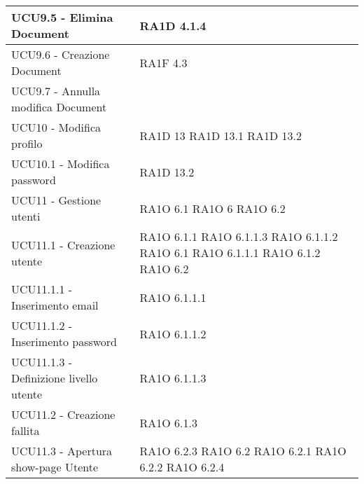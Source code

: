 \begin{center}
\begin{longtable}{ | p{5cm} | p{5cm} |}
            UCU9.5 - Elimina Document &  RA1D 4.1.4  \newline  \\ \hline      
            UCU9.6 - Creazione Document &  RA1F 4.3 \newline  \\ \hline      
            UCU9.7 - Annulla modifica Document &  \\ \hline      
            UCU10 - Modifica profilo &  RA1D 13 \newline  RA1D 13.1 \newline  RA1D 13.2 \newline  \\ \hline      
            UCU10.1 - Modifica password &  RA1D 13.2 \newline  \\ \hline      
            UCU11 - Gestione utenti &  RA1O 6.1  \newline  RA1O 6 \newline  RA1O 6.2  \newline  \\ \hline      
            UCU11.1 - Creazione utente &  RA1O 6.1.1  \newline  RA1O 6.1.1.3  \newline  RA1O 6.1.1.2 \newline  RA1O 6.1  \newline  RA1O 6.1.1.1  \newline  RA1O 6.1.2  \newline  RA1O 6.2  \newline  \\ \hline      
            UCU11.1.1 - Inserimento email &  RA1O 6.1.1.1  \newline  \\ \hline      
            UCU11.1.2 - Inserimento password &  RA1O 6.1.1.2 \newline  \\ \hline      
            UCU11.1.3 - Definizione livello utente &  RA1O 6.1.1.3  \newline  \\ \hline      
            UCU11.2 - Creazione fallita &  RA1O 6.1.3  \newline  \\ \hline      
            UCU11.3 - Apertura show-page Utente &  RA1O 6.2.3 \newline  RA1O 6.2  \newline  RA1O 6.2.1 \newline  RA1O 6.2.2 \newline  RA1O 6.2.4 \newline  \\ \hline      

\end{longtable}
\end{center}
